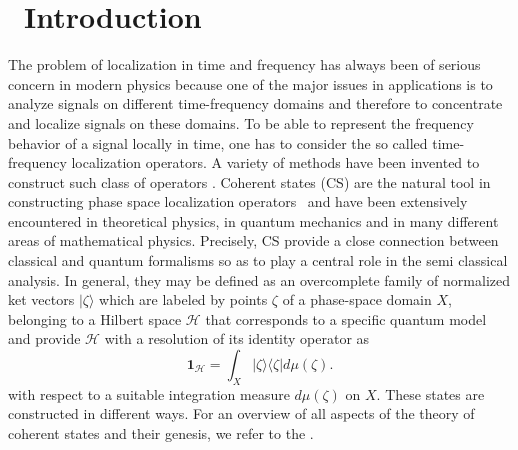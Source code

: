 \documentclass[12pt,reqno]{amsart}
\theoremstyle{definition}
\theoremstyle{remark}
\numberwithin{equation}{section}
\begin{document}
\maketitle


     



























\section{\ \textbf{Introduction}}

The problem of localization in time and frequency has always been of serious
concern in modern physics because one of the major issues in applications is
to analyze signals on different time-frequency domains and therefore to
concentrate and localize signals on these domains. To be able to represent
the frequency behavior of a signal locally in time, one has to consider the
so called time-frequency localization operators. A variety of methods have
been invented to construct such class of operators \cite{W}.
Coherent states (CS) are the natural tool in constructing phase space
localization operators \ and have been extensively encountered in
theoretical physics, in quantum mechanics and in many different areas of
mathematical physics. Precisely, CS provide a close connection between
classical and quantum formalisms so as to play a central role in the semi
classical analysis. In general, they may be defined as an overcomplete
family of normalized ket vectors $|\zeta \rangle $ which are labeled by
points $\zeta $ of a phase-space domain $X$, belonging to a Hilbert space $%
\mathcal{H}$ that corresponds to a specific quantum model and provide $%
\mathcal{H}$ with a resolution of its identity operator as 
\begin{equation}
\label{r1}
\mathbf{1}_{\mathcal{H}}=\int_{X}|\zeta \rangle \langle \zeta |d\mu (\zeta ).
\end{equation}
with respect to a suitable integration measure $d\mu (\zeta )$ on $X$. These
states are constructed in different ways. For an overview of all aspects of
the theory of coherent states and their genesis, we refer to the \cite{V,TP}.
\end{document}
